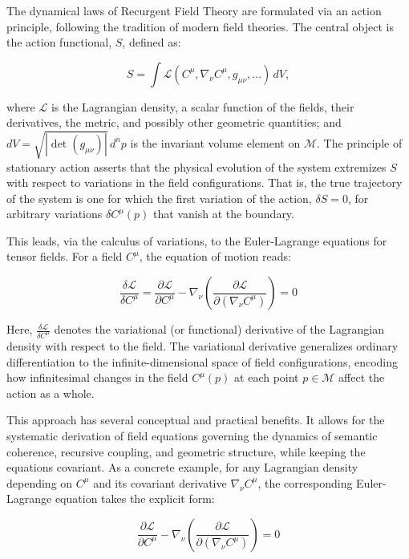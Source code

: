 The dynamical laws of Recurgent Field Theory are formulated via an action principle, following the tradition of modern field theories. The central object is the action functional, \(S\), defined as:

\begin{equation}
S = \int \mathcal{L}\left(C^\mu, \nabla_\nu C^\mu, g_{\mu\nu}, \ldots\right)\, dV,
\end{equation}

where \(\mathcal{L}\) is the Lagrangian density, a scalar function of the fields, their derivatives, the metric, and possibly other geometric quantities; and \(dV = \sqrt{|\det(g_{\mu\nu})|} \, d^n p\) is the invariant volume element on \(\mathcal{M}\). The principle of stationary action asserts that the physical evolution of the system extremizes \(S\) with respect to variations in the field configurations. That is, the true trajectory of the system is one for which the first variation of the action, \(\delta S = 0\), for arbitrary variations \(\delta C^\mu(p)\) that vanish at the boundary.

This leads, via the calculus of variations, to the Euler-Lagrange equations for tensor fields. For a field \(C^\mu\), the equation of motion reads:

\begin{equation}
\frac{\delta \mathcal{L}}{\delta C^\mu} = \frac{\partial \mathcal{L}}{\partial C^\mu} - \nabla_\nu \left( \frac{\partial \mathcal{L}}{\partial (\nabla_\nu C^\mu)} \right) = 0
\end{equation}

Here, \(\frac{\delta \mathcal{L}}{\delta C^\mu}\) denotes the variational (or functional) derivative of the Lagrangian density with respect to the field. The variational derivative generalizes ordinary differentiation to the infinite-dimensional space of field configurations, encoding how infinitesimal changes in the field \(C^\mu(p)\) at each point \(p \in \mathcal{M}\) affect the action as a whole.

This approach has several conceptual and practical benefits. It allows for the systematic derivation of field equations governing the dynamics of semantic coherence, recursive coupling, and geometric structure, while keeping the equations covariant. As a concrete example, for any Lagrangian density depending on \(C^\mu\) and its covariant derivative \(\nabla_\nu C^\mu\), the corresponding Euler-Lagrange equation takes the explicit form:

\begin{equation}
\frac{\partial \mathcal{L}}{\partial C^\mu} - \nabla_\nu \left( \frac{\partial \mathcal{L}}{\partial (\nabla_\nu C^\mu)} \right) = 0
\end{equation}

